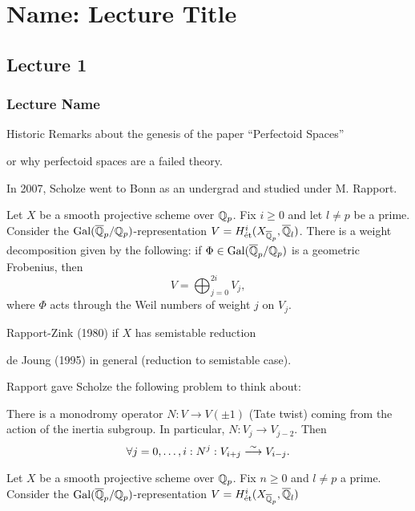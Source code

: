 \newpage
\section{Name: Lecture Title}
\subsection{Lecture 1}
\subsubsection{Lecture Name}

Historic Remarks about the genesis of the paper ``Perfectoid Spaces''

or why perfectoid spaces are a failed theory.

In 2007, Scholze went to Bonn as an undergrad and studied under M. Rapport. 


Let $X$ be a smooth projective scheme over $\mathbb{Q}_p$. Fix $i \geq 0$ and let $l \neq p$ be a prime. Consider the $\operatorname{Gal}(\overline{\mathbb{Q}}_p/\mathbb{Q}_p)$-representation $V= H_{\text{\'et}}^i(X_{\overline{\mathbb{Q}}_p}, \overline{\mathbb{Q}}_l)$. There is a weight decomposition given by the following: if $\Phi \in \operatorname{Gal}(\overline{\mathbb{Q}}_p/\mathbb{Q}_p)$ is a geometric Frobenius, then 
	\[
	V= \bigoplus_{j=0}^{2i} V_j,
	\]
where $\Phi$ acts through the Weil numbers of weight $j$ on $V_j$. 


Rapport-Zink (1980) if $X$ has semistable reduction 

de Joung (1995) in general (reduction to semistable case).


Rapport gave Scholze the following problem to think about:

There is a monodromy operator $N: V \to V(\pm 1)$ (Tate twist) coming from the action of the inertia subgroup. In particular, $N: V_j \to V_{j-2}$. Then
	\[
	\forall j=0,\ldots,i: N^j: V_{i+j} \stackrel{\sim}{\longrightarrow} V_{i-j}.
	\]









\begin{conj}
Let $X$ be a smooth projective scheme over $\mathbb{Q}_p$. Fix $n \geq 0$ and $l \neq p$ a prime. Consider the $\operatorname{Gal}(\overline{\mathbb{Q}}_p/\mathbb{Q}_p)$-representation $V= H_{\text{\'et}}^i(X_{\overline{\mathbb{Q}}_p}, \overline{\mathbb{Q}}_l)$
\end{conj}



